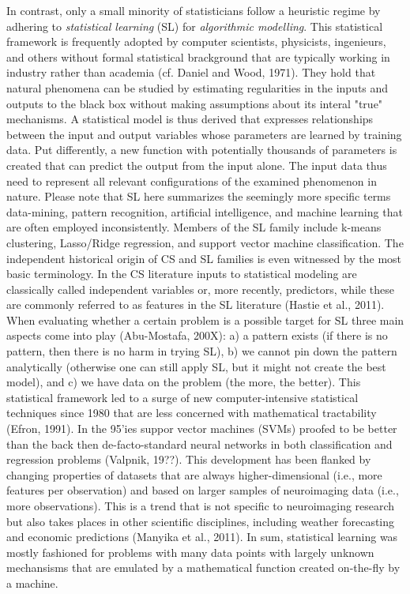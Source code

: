 \documentclass[authoryear,review,3p]{elsarticle}
\begin{document}
In contrast, only a small minority of statisticians
follow a heuristic regime by
adhering to \textit{statistical learning} (SL) for
\textit{algorithmic modelling}.
This statistical framework is frequently adopted by computer scientists,
physicists, ingenieurs, and others without formal statistical brackground
that are typically working in industry
rather than academia (cf. Daniel and Wood, 1971).
%
They hold that natural phenomena
can be studied by estimating regularities in the inputs and
outputs to the black box without making assumptions
about its interal "true" mechanisms.
A statistical model is thus derived that expresses
relationships between the input and output variables
whose parameters are learned by training data.
Put differently, a new function with potentially thousands of
parameters is created
that can predict the output from the input alone.
The input data thus need to represent
all relevant configurations of the examined phenomenon in nature.
%
Please note that SL here summarizes the seemingly more specific terms
data-mining, pattern recognition, artificial intelligence,
and machine learning that are often employed inconsistently.
Members of
the SL family include k-means clustering,
Lasso/Ridge regression, and support vector machine classification.
The independent historical origin of CS and SL families is even
witnessed by the most basic terminology. 
In the CS literature inputs to statistical modeling
are classically called independent variables or, more recently, predictors,
while these are commonly referred to as features
in the SL literature (Hastie et al., 2011).
%
When evaluating whether a certain problem is a possible target for SL
three main aspects come into play (Abu-Mostafa, 200X):
a) a pattern exists
(if there is no pattern, then there is no harm in trying SL),
b) we cannot pin down the pattern analytically
(otherwise one can still apply SL, but it might not create the best model),
and
c) we have data on the problem
(the more, the better).
%
This statistical framework led to a surge of new
computer-intensive statistical techniques since 1980
that are less concerned with mathematical tractability (Efron, 1991).
In the 95'ies suppor vector machines (SVMs)
proofed to be better than the back then de-facto-standard neural networks
in both classification and regression problems (Valpnik, 19??).
This development has been flanked by changing properties of datasets that
are always higher-dimensional (i.e., more features per observation)
and
based
on larger samples of neuroimaging data (i.e., more observations).
This is a trend that is not specific to
neuroimaging research but also takes places
in other scientific disciplines,
including weather forecasting and economic predictions
(Manyika et al., 2011).
In sum,
statistical learning was mostly fashioned
for problems with many data points with largely unknown mechansisms
that are emulated by a mathematical function
created on-the-fly by a machine.
\end{document}
